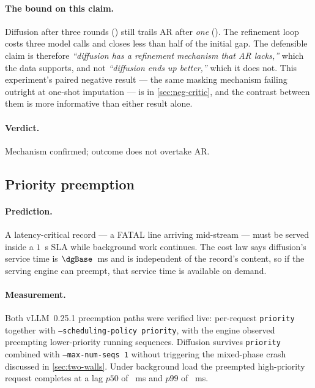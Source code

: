 \paragraph{The bound on this claim.} Diffusion after three rounds
() still trails AR after \emph{one} (). The
refinement loop costs three model calls and closes less than half of the initial
gap. The defensible claim is therefore \emph{``diffusion has a refinement
mechanism that AR lacks,''} which the data supports, and not \emph{``diffusion
ends up better,''} which it does not. This experiment's paired negative result
--- the same masking mechanism failing outright at one-shot imputation --- is in
\cref{sec:neg-critic}, and the contrast between them is more informative than
either result alone.

\paragraph{Verdict.} Mechanism confirmed; outcome does not overtake AR.

\subsection{Priority preemption}
\label{sec:app-vip}

\paragraph{Prediction.} A latency-critical record --- a FATAL line arriving
mid-stream --- must be served inside a $1$~s SLA while background work
continues. The cost law says diffusion's service time is
$\dgBase$~ms and is independent of the record's content, so if the serving
engine can preempt, that service time is available on demand.

\paragraph{Measurement.} Both vLLM~0.25.1 preemption paths were verified live:
per-request \texttt{priority} together with
\texttt{--scheduling-policy priority}, with the engine observed preempting
lower-priority running sequences. Diffusion survives \texttt{priority} combined
with \texttt{--max-num-seqs 1} without triggering the mixed-phase crash
discussed in \cref{sec:two-walls}. Under background load the preempted
high-priority request completes at a lag $p50$ of ~ms
and $p99$ of ~ms.

